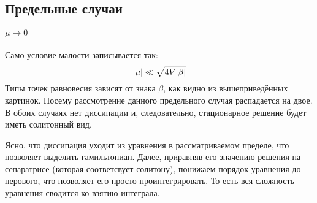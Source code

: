 \documentclass[titlepage]{article}
\begin{document}
\subsection{Предельные случаи}\label{addition}
\paragraph{$\mu \longrightarrow 0$}
Само условие малости записывается так:
\begin{equation}
 \abs{\mu} \ll \sqrt{4V\abs{\beta}}
\end{equation}
Типы точек равновесия зависят от знака $\beta$, как видно из вышеприведённых картинок. Посему рассмотрение данного предельного случая распадается на двое. В обоих случаях нет диссипации и, следовательно, стационарное решение будет иметь солитонный вид. 
\par Ясно, что диссипация уходит из уравнения в рассматриваемом пределе, что позволяет выделить гамильтониан. Далее, приравняв его значению решения на сепаратрисе (которая соответсвует солитону), понижаем порядок уравнения до перового, что позволяет его просто проинтегрировать. То есть вся сложность уравнения сводится ко взятию интеграла.
\end{document}
